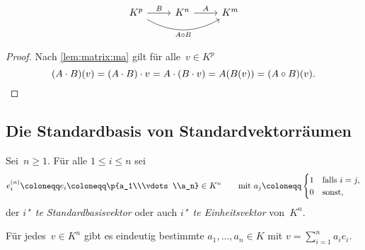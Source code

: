 \documentclass[a4paper]{article}
\begin{document}
\begin{equation*}
    \begin{tikzcd}
        K^p \ar[rr, bend right, "A\circ B"'] \ar[r, "B"] & K^n \ar[r, "A"] & K^m
    \end{tikzcd}
\end{equation*}

\begin{proof}
    Nach \cref{lem:matrix:ma} gilt für alle~$v \in K^p$
    \begin{equation*}
        (A\cdot B)(v) = (A\cdot B)\cdot v = A\cdot(B\cdot v) = A(B(v)) = (A\circ B)(v). \qedhere
    \end{equation*}
\end{proof}

\subsection{Die Standardbasis von Standardvektorräumen}

\begin{definition}[Standardbasisvektor]
    Sei~$n \geq 1$. Für alle $1 \leq i \leq n$ sei
    \begin{equation*}
        e^{(n)}_i \coloneqq e_i \coloneqq \p{a_1\\\vdots\\a_n} \in K^n \qquad\text{mit } a_j \coloneqq \begin{cases}
            1 & \text{falls } i = j, \\
            0 & \text{sonst},
        \end{cases}
    \end{equation*}
    der \emph{$i$"~te Standardbasisvektor} oder auch \emph{$i$"~te Einheitsvektor} von~$K^n$.
\end{definition}

\begin{lemma}\label{lem:canonicalbasis}
    Für jedes~$v \in K^n$ gibt es eindeutig bestimmte $a_1,\dots,a_n \in K$ mit $v = \sum_{i=1}^n a_ie_i$.
\end{lemma}
\end{document}
